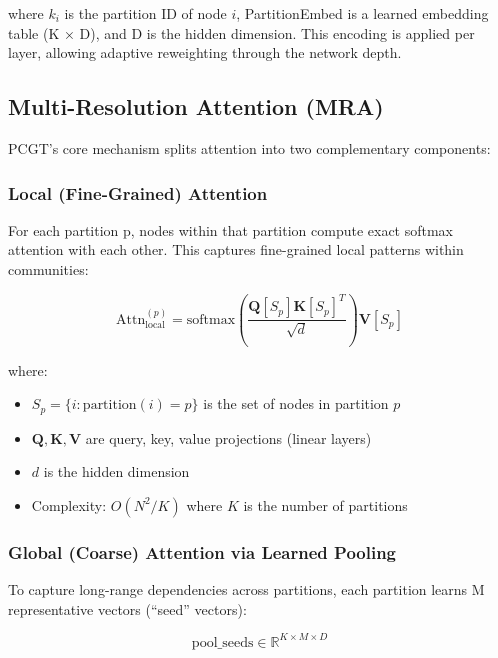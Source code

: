 \documentclass[11pt, a4paper]{article}
\begin{document}
where $k_i$ is the partition ID of node $i$, PartitionEmbed is a learned embedding table (K × D), and D is the hidden dimension. This encoding is applied per layer, allowing adaptive reweighting through the network depth.

\subsection{Multi-Resolution Attention (MRA)}

PCGT's core mechanism splits attention into two complementary components:

\subsubsection{Local (Fine-Grained) Attention}

For each partition p, nodes within that partition compute exact softmax attention with each other. This captures fine-grained local patterns within communities:

\begin{equation}
\text{Attn}_{\text{local}}^{(p)} = \text{softmax}\left( \frac{\mathbf{Q}[S_p] \mathbf{K}[S_p]^T}{\sqrt{d}} \right) \mathbf{V}[S_p]
\end{equation}

where:
\begin{itemize}
    \item $S_p = \{ i : \text{partition}(i) = p \}$ is the set of nodes in partition $p$
    \item $\mathbf{Q}, \mathbf{K}, \mathbf{V}$ are query, key, value projections (linear layers)
    \item $d$ is the hidden dimension
    \item Complexity: $O(N^2 / K)$ where $K$ is the number of partitions
\end{itemize}

\subsubsection{Global (Coarse) Attention via Learned Pooling}

To capture long-range dependencies across partitions, each partition learns M representative vectors (``seed'' vectors):

\begin{equation}
\text{pool\_seeds} \in \mathbb{R}^{K \times M \times D}
\end{equation}
\end{document}
